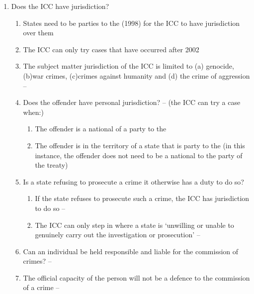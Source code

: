 \begin{enumerate}
    \item Does the ICC have jurisdiction?
    \begin{enumerate}
        \item States need to be parties to the  (1998) for the ICC to have jurisdiction over them
        \item The ICC can only try cases that have occurred after 2002
        \item The subject matter jurisdiction of the ICC is limited to (a) genocide, (b)war crimes, (c)crimes against humanity and (d) the crime of aggression -- 
        \item Does the offender have personal jurisdiction? --  (the ICC can try a case when:)
        \begin{enumerate}
            \item The offender is a national of a party to the 
            \item The offender is in the territory of a state that is party to the  (in this instance, the offender does not need to be a national to the party of the treaty)
        \end{enumerate}
        \item Is a state refusing to prosecute a crime it otherwise has a duty to do so?
        \begin{enumerate}
            \item If the state refuses to prosecute such a crime, the ICC has jurisdiction to do so -- 
            \item The ICC can only step in where a state is `unwilling or unable to genuinely carry out the investigation or prosecution' -- 
        \end{enumerate}
        \item Can an individual be held responsible and liable for the commission of crimes? -- 
        \item The official capacity of the person will not be a defence to the commission of a crime -- 

\end{enumerate}
\end{enumerate}

